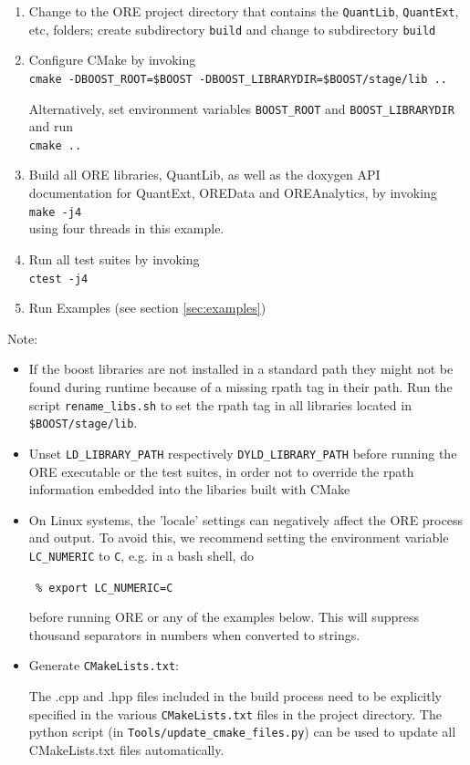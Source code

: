 \documentclass[12pt, a4paper]{article}
\begin{document}
\begin{enumerate}
\item Change to the ORE project directory that contains the {\tt QuantLib}, {\tt QuantExt}, etc, folders; create subdirectory {\tt build} and change to subdirectory {\tt build}
\item Configure CMake by invoking \\
\medskip
{\tt cmake -DBOOST\_ROOT=\${BOOST} -DBOOST\_LIBRARYDIR=\${BOOST}/stage/lib ..} \\
\medskip

Alternatively, set environment variables {\tt BOOST\_ROOT} and {\tt BOOST\_LIBRARYDIR} and run \\
\medskip
{\tt cmake ..} \\
\medskip
\item Build all ORE libraries, QuantLib, as well as the doxygen API documentation for QuantExt, OREData and OREAnalytics, by invoking \\
\medskip
{\tt make -j4} \\
\medskip
using four threads in this example.
\medskip
\item Run all test suites by invoking \\
\medskip
{\tt ctest -j4}
\item Run Examples (see section \ref{sec:examples})
\end{enumerate}

Note: 
\begin{itemize}
\item If the boost libraries are not installed in a standard path they might not be found during runtime because of a missing rpath
tag in their path. Run the script {\tt rename\_libs.sh} to set the rpath tag in all libraries located in {\tt
  \${BOOST}/stage/lib}.
\item Unset {\tt LD\_LIBRARY\_PATH} respectively {\tt DYLD\_LIBRARY\_PATH} before running the ORE executable or the test suites, in order not to override the rpath information embedded into the libaries built with CMake
\item On Linux systems, the 'locale' settings can negatively affect the ORE process and output. To avoid this, we
recommend setting the environment variable {\tt LC\_NUMERIC} to {\tt C}, e.g. in a bash shell, do

{\tt\footnotesize
\% export LC\_NUMERIC=C
}

before running ORE or any of the examples below. This will suppress thousand separators in numbers when converted to
strings.

\item Generate {\tt CMakeLists.txt}:

The .cpp and .hpp files included in the build process need to be explicitly specified in the various {\tt CMakeLists.txt} 
files in the project directory. The python script (in {\tt Tools/update\_cmake\_files.py}) can be used to update all CMakeLists.txt files 
automatically. 

\end{itemize}
 
\end{document}
